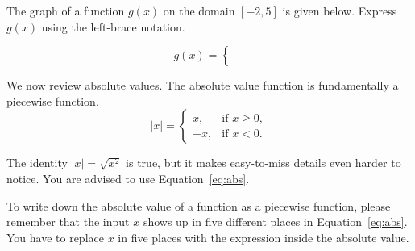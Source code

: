 \documentclass[../main.tex]{subfiles}
\begin{document}
\begin{exercise}
  The graph of a function \(g(x)\) on the domain \([-2,5]\) is given below. Express \(g(x)\) using the left-brace notation.

  \begin{minipage}{3in}
  \end{minipage}
  \begin{minipage}{2in}
    \[
      g(x) =
      \begin{cases}
        \phantom{a} \\[10ex]
        \phantom{a}
      \end{cases}
    \]
  \end{minipage}

  \blanks*
\end{exercise}
\clearpage

We now review absolute values. The absolute value function is fundamentally a piecewise function.
\begin{equation} \label{eq:abs}
  |x| =
  \begin{cases}
    x, &\text{if } x \ge 0, \\
    -x, &\text{if } x < 0.
  \end{cases}
\end{equation}

\faExclamationTriangle{} The identity \(|x| = \sqrt{x^{2}}\) is true, but it makes easy-to-miss details even harder to notice. You are advised to use Equation~\eqref{eq:abs}.

To write down the absolute value of a function as a piecewise function, please remember that the input \(x\) shows up in five different places in Equation~\eqref{eq:abs}. You have to replace \(x\) in five places with the expression inside the absolute value.
\end{document}
